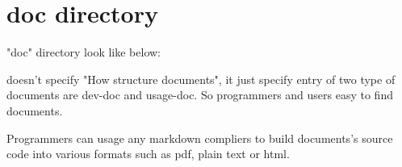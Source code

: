 \section{doc directory}

\begin{crules}
\end{crules}

"doc" directory look like below:\\

\pkgname{} doesn't specify "How structure documents", it just specify entry
of two type of documents are \mbox{dev-doc} and \mbox{usage-doc}. So
programmers and users easy to find documents.

Programmers can usage any markdown compliers to build documents's source code
into various formats such as pdf, plain text or html.
